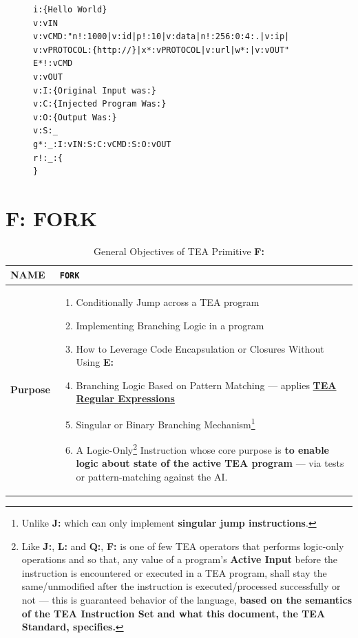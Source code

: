 \documentclass[a4paper, 18pt]{book} %
\begin{document}
 \begin{figure}[H]
 \Large
  \begin{tcolorbox}[teaterminalstyle, title=TEA Program: TEA VIRUS Example]
  \begin{lstlisting}[language=TEA]
i:{Hello World}
v:vIN
v:vCMD:"n!:1000|v:id|p!:10|v:data|n!:256:0:4:.|v:ip|
v:vPROTOCOL:{http://}|x*:vPROTOCOL|v:url|w*:|v:vOUT"
E*!:vCMD
v:vOUT
v:I:{Original Input was:}
v:C:{Injected Program Was:}
v:O:{Output Was:}
v:S:_
g*:_:I:vIN:S:C:vCMD:S:O:vOUT
r!:_:{
}
   \end{lstlisting}
  \end{tcolorbox}
  \label{FIGE2}
\end{figure}




\chapter{F: FORK}
\label{CHAPF}


\begin{table}[H]
  \centering
  \LARGE
	\begin{tabular}[t]{|p{}|p{}}
 
	\textbf{NAME} & \texttt{FORK}\\
	\hline
	\textbf{Purpose} & \begin{enumerate}
	\item Conditionally Jump across a TEA program
	\item Implementing Branching Logic in a program
	\item How to Leverage Code Encapsulation or Closures Without Using \textbf{E:}
	\item Branching Logic Based on Pattern Matching --- applies \textbf{\hyperref[SECREGEXP]{TEA Regular Expressions}}
	\item Singular or Binary Branching Mechanism\footnote{Unlike \textbf{J:} which can only implement \textbf{singular jump instructions}.}
	\item A Logic-Only\footnote{Like \textbf{J:}, \textbf{L:} and \textbf{Q:}, \textbf{F:} is one of few TEA operators that performs logic-only operations and so that, any value of a program's \textbf{Active Input} before the instruction is encountered or executed in a TEA program, shall stay the same/unmodified after the instruction is executed/processed successfully or not --- this is guaranteed behavior of the language, \textbf{based on the semantics of the TEA Instruction Set and what this document, the TEA Standard, specifies.}} Instruction whose core purpose is \textbf{to enable logic about state of the active TEA program} --- via tests or pattern-matching against the AI.
	\end{enumerate}\\
	\hline
	              
\end{tabular}
\caption{General Objectives of TEA Primitive \textbf{F:}}
  \label{TABTAZF}
\end{table}
\end{document}
